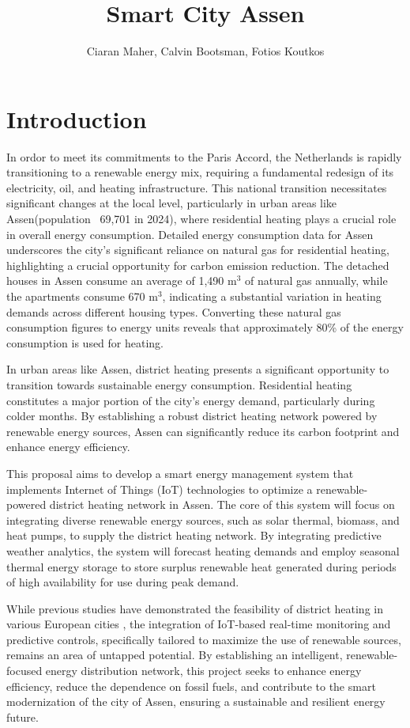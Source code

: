 \documentclass[conference]{IEEEtran}
\title{Smart City Assen}
\author{Ciaran Maher, Calvin Bootsman, Fotios Koutkos}
\begin{document}
\maketitle
\section{Introduction}
In ordor to meet its commitments to the Paris Accord, the Netherlands is rapidly transitioning to a renewable energy mix, requiring a fundamental redesign of its electricity, oil, and heating infrastructure\cite{paris_agreement}. This national transition necessitates significant changes at the local level, particularly in urban areas like Assen(population ~69,701 in 2024\cite{allecijfers}), where residential heating plays a crucial role in overall energy consumption. Detailed energy consumption data for Assen underscores the city's significant reliance on natural gas for residential heating, highlighting a crucial opportunity for carbon emission reduction. The detached houses in Assen consume an average of 1,490 m$^3$ of natural gas annually, while the apartments consume 670 m$^3$\cite{assen_woningen}, indicating a substantial variation in heating demands across different housing types. Converting these natural gas consumption figures to energy units reveals that approximately 80\% of the energy consumption is used for heating.

In urban areas like Assen, district heating presents a significant opportunity to transition towards sustainable energy consumption. Residential heating constitutes a major portion of the city's energy demand, particularly during colder months. By establishing a robust district heating network powered by renewable energy sources, Assen can significantly reduce its carbon footprint and enhance energy efficiency\cite{allecijfers}.

This proposal aims to develop a smart energy management system that implements Internet of Things (IoT) technologies to optimize a renewable-powered district heating network in Assen. The core of this system will focus on integrating diverse renewable energy sources, such as solar thermal, biomass, and heat pumps, to supply the district heating network. By integrating predictive weather analytics, the system will forecast heating demands and employ seasonal thermal energy storage to store surplus renewable heat generated during periods of high availability for use during peak demand.

While previous studies have demonstrated the feasibility of district heating in various European cities \cite{kalundborg}, the integration of IoT-based real-time monitoring and predictive controls, specifically tailored to maximize the use of renewable sources, remains an area of untapped potential. By establishing an intelligent, renewable-focused energy distribution network, this project seeks to enhance energy efficiency, reduce the dependence on fossil fuels, and contribute to the smart modernization of the city of Assen, ensuring a sustainable and resilient energy future.
\end{document}
